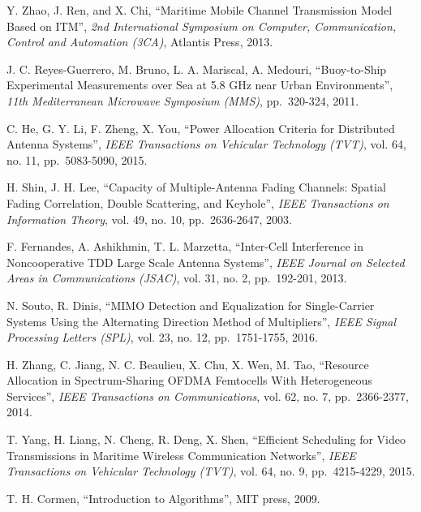 \documentclass{ieeeaccess}
\begin{document}
\begin{thebibliography}{10}
Y. Zhao, J. Ren, and X. Chi, ``Maritime Mobile Channel Transmission Model Based on ITM'',
\emph{2nd International Symposium on Computer, Communication, Control and Automation (3CA)}, Atlantis Press, 2013.

J. C. Reyes-Guerrero, M. Bruno, L. A. Mariscal, A. Medouri, ``Buoy-to-Ship Experimental Measurements over Sea at 5.8 GHz near Urban Environments'',
\emph{11th Mediterranean Microwave Symposium (MMS)}, pp.~320-324, 2011.

C. He, G. Y. Li, F. Zheng, X. You, ``Power Allocation Criteria for Distributed Antenna Systems'',
\emph{IEEE Transactions on Vehicular Technology (TVT)}, vol. 64, no. 11, pp.~5083-5090, 2015.

H. Shin, J. H. Lee, ``Capacity of Multiple-Antenna Fading Channels: Spatial Fading Correlation, Double Scattering, and Keyhole'',
\emph{IEEE Transactions on Information Theory}, vol. 49, no. 10, pp.~2636-2647, 2003.

F. Fernandes, A. Ashikhmin, T. L. Marzetta, ``Inter-Cell Interference in Noncooperative TDD Large Scale Antenna Systems'',
\emph{IEEE Journal on Selected Areas in Communications (JSAC)}, vol. 31, no. 2, pp.~192-201, 2013.

N. Souto, R. Dinis, ``MIMO Detection and Equalization for Single-Carrier Systems Using the Alternating Direction Method of Multipliers'',
\emph{IEEE Signal Processing Letters (SPL)}, vol. 23, no. 12, pp.~1751-1755, 2016.

H. Zhang, C. Jiang, N. C. Beaulieu, X. Chu, X. Wen, M. Tao, ``Resource Allocation in Spectrum-Sharing OFDMA Femtocells With Heterogeneous Services'',
\emph{IEEE Transactions on Communications}, vol. 62, no. 7, pp.~2366-2377, 2014.

T. Yang, H. Liang, N. Cheng, R. Deng, X. Shen, ``Efficient Scheduling for Video Transmissions in Maritime Wireless Communication Networks'',
\emph{IEEE Transactions on Vehicular Technology (TVT)}, vol. 64, no. 9, pp.~4215-4229, 2015.

T. H. Cormen, ``Introduction to Algorithms'', MIT press, 2009.

\end{thebibliography}
\end{document}
